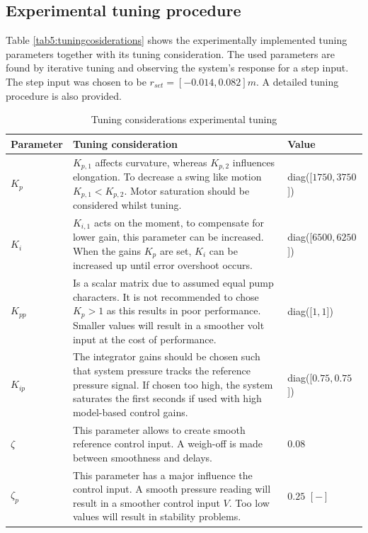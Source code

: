 \subsection*{Experimental tuning procedure}


Table \ref{tab5:tuningcosiderations} shows the experimentally implemented tuning parameters together with its tuning consideration. The used parameters are found by iterative tuning and observing the system's response for a step input. The step input was chosen to be $r_{set} = [-0.014,0.082]m$. A detailed tuning procedure is also provided. 


\begin{table}[H]
    \centering
     \caption{Tuning considerations experimental tuning}
    \begin{tabular}{p{2.5cm} p{9cm} p{3cm}} \hline
      \textbf{Parameter}   & \textbf{Tuning  consideration} & \textbf{Value } \\ \hline
      $K_p$   &   $K_{p,1}$ affects curvature, whereas $K_{p,2}$ influences elongation. To decrease a swing like motion $K_{p,1} < K_{p,2}$. Motor saturation should be considered whilst tuning.   &  diag([$1750,3750$])            \\ \hline
      $K_i$   &   $K_{i,1}$ acts on the moment, to compensate for lower gain, this parameter can be increased. When the gains $K_p$ are set, $K_i$ can be increased up until error overshoot occurs.   &  diag([$6500,6250$])    \\ \hline
      $K_{pp}$   &  Is a scalar matrix due to assumed equal pump characters. It is not recommended to chose $K_p >1$ as this results in poor performance. Smaller values will result in a smoother volt input at the cost of performance.  &  diag([$1 ,1$])     \\ \hline
      $K_{ip}$   &  The integrator gains should be chosen such that system pressure tracks the reference pressure signal. If chosen too high, the system saturates the first seconds if used with high model-based control gains.    &  diag([$0.75,0.75$])    \\ \hline
      $\zeta$    &   This parameter allows to create smooth reference control input. A weigh-off is made between smoothness and delays. &  $0.08$  \\ \hline
      $\zeta_p$    &   This parameter has a major influence the control input. A smooth pressure reading will result in a smoother control input $V$. Too low values will result in stability problems.   & $0.25$ $[-]$  \\ \hline

\end{tabular}
\end{table}
